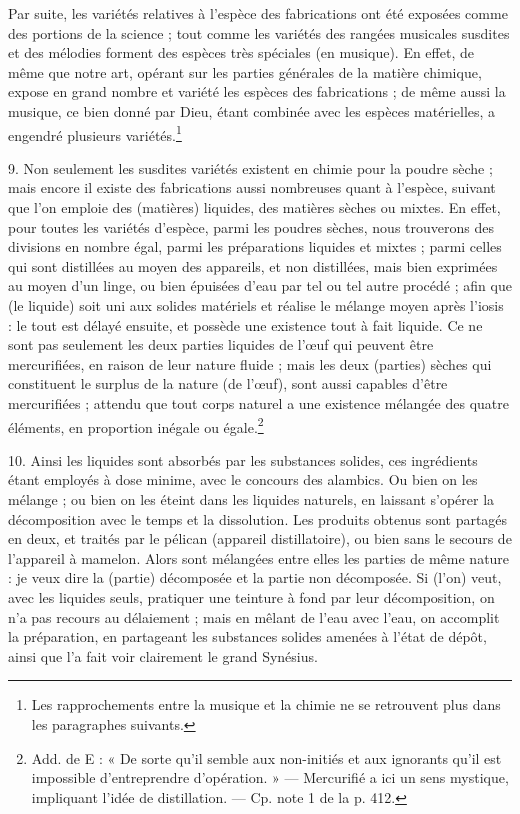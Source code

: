 \documentclass[a4paper, 11pt, oneside, polutonikogreek, french]{article}
\begin{document}
Par suite, les variétés relatives à l'espèce des fabrications ont été exposées comme des portions de la science ; tout comme les variétés des rangées musicales susdites et des mélodies forment des espèces très spéciales (en musique). En effet, de même que notre art, opérant sur les parties générales de la matière chimique, expose en grand nombre et variété les espèces des fabrications ; de même aussi la musique, ce bien donné par Dieu, étant combinée avec les espèces matérielles, a engendré plusieurs variétés.\footnote{Les rapprochements entre la musique et la chimie ne se retrouvent plus dans les paragraphes suivants.}

9. Non seulement les susdites variétés existent en chimie pour la poudre sèche ; mais encore il existe des fabrications aussi nombreuses quant à l'espèce, suivant que l'on emploie des (matières) liquides, des matières sèches ou mixtes. En effet, pour toutes les variétés d'espèce, parmi les poudres sèches, nous trouverons des divisions en nombre égal, parmi les préparations liquides et mixtes ; parmi celles qui sont distillées au moyen des appareils, et non distillées, mais bien exprimées au moyen d'un linge, ou bien épuisées d'eau par tel ou tel autre procédé ; afin que (le liquide) soit uni aux solides matériels et réalise le mélange moyen après l'iosis : le tout est délayé ensuite, et possède une existence tout à fait liquide. Ce ne sont pas seulement les deux parties liquides de l'œuf qui peuvent être mercurifiées, en raison de leur nature fluide ; mais les deux (parties) sèches qui constituent le surplus de la nature (de l'œuf), sont aussi capables d'être mercurifiées ; attendu que tout corps naturel a une existence mélangée des quatre éléments, en proportion inégale ou égale.\footnote{Add. de E : « De sorte qu'il semble aux non-initiés et aux ignorants qu'il est impossible d'entreprendre d'opération. » --- Mercurifié a ici un sens mystique, impliquant l'idée de distillation. --- Cp. note 1 de la p. 412.}

10. Ainsi les liquides sont absorbés par les substances solides, ces ingrédients étant employés à dose minime, avec le concours des alambics. Ou bien on les mélange ; ou bien on les éteint dans les liquides naturels, en laissant s'opérer la décomposition avec le temps et la dissolution. Les produits obtenus sont partagés en deux, et traités par le pélican (appareil distillatoire), ou bien sans le secours de l'appareil à mamelon. Alors sont mélangées entre elles les parties de même nature : je veux dire la (partie) décomposée et la partie non décomposée. Si (l'on) veut, avec les liquides seuls, pratiquer une teinture à fond par leur décomposition, on n'a pas recours au délaiement ; mais en mêlant de l'eau avec l'eau, on accomplit la préparation, en partageant les substances solides amenées à l'état de dépôt, ainsi que l'a fait voir clairement le grand Synésius.
\end{document}
